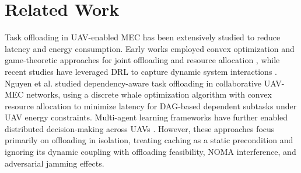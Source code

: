 \documentclass[journal]{IEEEtran}
\begin{document}








\section{Related Work}
\label{sec_II}

Task offloading in UAV-enabled MEC has been extensively 
studied to reduce latency and energy consumption. Early 
works employed convex optimization and game-theoretic 
approaches for joint offloading and resource allocation 
\cite{barman2025joint}, while recent studies have 
leveraged DRL to capture dynamic system interactions \cite{yang2026drl}. Nguyen et al. \cite{10004947} studied dependency-aware task offloading in collaborative UAV-MEC networks, using a discrete whale optimization algorithm with convex resource allocation to minimize latency for DAG-based dependent subtasks under UAV energy constraints. Multi-agent learning frameworks have further enabled distributed decision-making across UAVs 
\cite{kang2023cooperative, tariq2024toward}. However, these approaches focus primarily on offloading in isolation, treating caching as a static precondition 
and ignoring its dynamic coupling with offloading 
feasibility, NOMA interference, and adversarial 
jamming effects.
\end{document}
